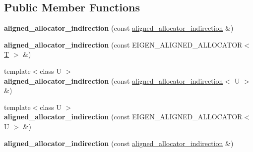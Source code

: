 \subsection*{Public Member Functions}
\begin{DoxyCompactItemize}
\item 
\mbox{\label{class_eigen_1_1aligned__allocator__indirection_ac2516527cfcc701bf5f514c636aeb597}} 
{\bfseries aligned\+\_\+allocator\+\_\+indirection} (const \hyperlink{class_eigen_1_1aligned__allocator__indirection}{aligned\+\_\+allocator\+\_\+indirection} \&)
\item 
\mbox{\label{class_eigen_1_1aligned__allocator__indirection_aee11c7f6c62a3bee4c67d8d737cb016e}} 
{\bfseries aligned\+\_\+allocator\+\_\+indirection} (const E\+I\+G\+E\+N\+\_\+\+A\+L\+I\+G\+N\+E\+D\+\_\+\+A\+L\+L\+O\+C\+A\+T\+OR$<$ \hyperlink{group___sparse_core___module}{T} $>$ \&)
\item 
\mbox{\label{class_eigen_1_1aligned__allocator__indirection_a1e6768d759dca2902bfaac420f145b37}} 
{\footnotesize template$<$class U $>$ }\\{\bfseries aligned\+\_\+allocator\+\_\+indirection} (const \hyperlink{class_eigen_1_1aligned__allocator__indirection}{aligned\+\_\+allocator\+\_\+indirection}$<$ U $>$ \&)
\item 
\mbox{\label{class_eigen_1_1aligned__allocator__indirection_aa47167e9b3924f7e05e4171685b6998e}} 
{\footnotesize template$<$class U $>$ }\\{\bfseries aligned\+\_\+allocator\+\_\+indirection} (const E\+I\+G\+E\+N\+\_\+\+A\+L\+I\+G\+N\+E\+D\+\_\+\+A\+L\+L\+O\+C\+A\+T\+OR$<$ U $>$ \&)
\item 
\mbox{\label{class_eigen_1_1aligned__allocator__indirection_ac2516527cfcc701bf5f514c636aeb597}} 
{\bfseries aligned\+\_\+allocator\+\_\+indirection} (const \hyperlink{class_eigen_1_1aligned__allocator__indirection}{aligned\+\_\+allocator\+\_\+indirection} \&)
\item 
\mbox{\label{class_eigen_1_1aligned__allocator__indirection_aee11c7f6c62a3bee4c67d8d737cb016e}} 

\end{DoxyCompactItemize}
